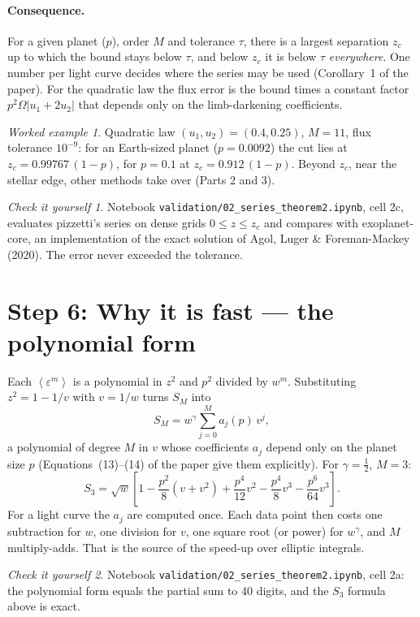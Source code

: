 \documentclass[11pt,a4paper]{article}
\theoremstyle{remark}
\newtheorem*{example}{Worked example}
\newtheorem*{checkit}{Check it yourself}
\newcommand{\avg}[1]{\left\langle #1 \right\rangle}
\newcommand{\nb}[1]{\texttt{validation/#1}}
\begin{document}
\paragraph{Consequence.} For a given planet ($p$), order $M$ and tolerance $\tau$, there is a
largest separation $z_c$ up to which the bound stays below $\tau$, and below $z_c$ it is below
$\tau$ \emph{everywhere}. One number per light curve decides where the series may be used
(Corollary~1 of the paper). For the quadratic law the flux error is the bound times a constant
factor $p^2\Omega|u_1+2u_2|$ that depends only on the limb-darkening coefficients.

\begin{example}
Quadratic law $(u_1,u_2)=(0.4,0.25)$, $M=11$, flux tolerance $10^{-9}$: for an Earth-sized planet
($p=0.0092$) the cut lies at $z_c=0.99767\,(1-p)$, for $p=0.1$ at $z_c=0.912\,(1-p)$.
Beyond $z_c$, near the stellar edge, other methods take over (Parts 2 and 3).
\end{example}

\begin{checkit}
Notebook \nb{02\_series\_theorem2.ipynb}, cell 2c, evaluates pizzetti's series on dense grids
$0\le z\le z_c$ and compares with exoplanet-core, an implementation of the exact solution of Agol,
Luger \& Foreman-Mackey (2020). The error never exceeded the tolerance.
\end{checkit}

\section{Step 6: Why it is fast --- the polynomial form}

Each $\avg{\varepsilon^m}$ is a polynomial in $z^2$ and $p^2$ divided by $w^m$. Substituting
$z^2=1-1/v$ with $v=1/w$ turns $S_M$ into
\[
  S_M=w^\gamma\sum_{j=0}^Ma_j(p)\,v^j,
\]
a polynomial of degree $M$ in $v$ whose coefficients $a_j$ depend only on the planet size $p$
(Equations~(13)--(14) of the paper give them explicitly). For $\gamma=\tfrac12$, $M=3$:
\[
  S_3=\sqrt w\left[1-\frac{p^2}{8}(v+v^2)+\frac{p^4}{12}v^2-\frac{p^4}{8}v^3-\frac{p^6}{64}v^3\right].
\]
For a light curve the $a_j$ are computed once. Each data point then costs one subtraction for $w$,
one division for $v$, one square root (or power) for $w^\gamma$, and $M$ multiply-adds. That is
the source of the speed-up over elliptic integrals.

\begin{checkit}
Notebook \nb{02\_series\_theorem2.ipynb}, cell 2a: the polynomial form equals the partial sum to
40 digits, and the $S_3$ formula above is exact.
\end{checkit}
\end{document}

